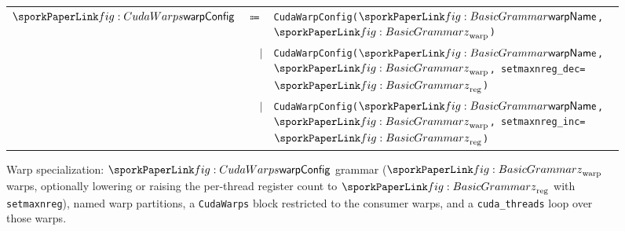 \begin{figure}[h]
\sporkCodeRule
\sbox{\warpStackBox}{\begin{sporkfigure}\end{sporkfigure}}%
\begin{minipage}[t]{\dimexpr\linewidth-\wd\warpStackBox-4mm\relax}
\vspace{0pt}
{\sporkGrammarStuff\raggedright
\begin{tabular}{rrl}
  $\sporkwarpConfig$ & $\Coloneqq$ & \texttt{CudaWarpConfig($\sporkwarpName$, $\sporkz_\mathrm{warp}$)} \\
  & $|$ & \texttt{CudaWarpConfig($\sporkwarpName$, $\sporkz_\mathrm{warp}$, setmaxnreg\_dec=$\sporkz_\mathrm{reg}$)} \\
  & $|$ & \texttt{CudaWarpConfig($\sporkwarpName$, $\sporkz_\mathrm{warp}$, setmaxnreg\_inc=$\sporkz_\mathrm{reg}$)} \\
\bottomrule
\end{tabular}\par}
\vspace{4mm}
\end{minipage}%
%
\hfill
\begin{minipage}[t]{\wd\warpStackBox}
\vspace{0pt}
\usebox{\warpStackBox}
\end{minipage}
\caption{Warp specialization: $\sporkwarpConfig$ grammar ($\sporkz_\mathrm{warp}$ warps, optionally lowering or raising the per-thread register count to $\sporkz_\mathrm{reg}$ with \texttt{setmaxnreg}), named warp partitions, a \texttt{CudaWarps} block restricted to the consumer warps, and a \texttt{cuda\_threads} loop over those warps.}
\label{fig:CudaWarps}
\sporkCodeRule
\end{figure}
